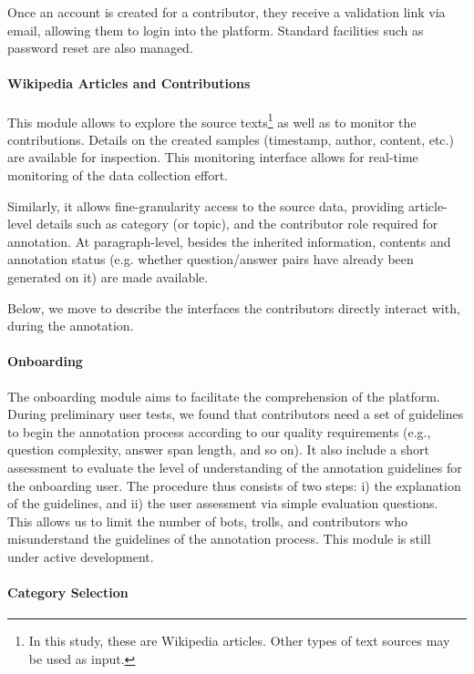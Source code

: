 \documentclass[10pt, a4paper]{article}
\begin{document}
Once an account is created for a contributor, they receive a validation link via email, allowing them to login into the platform.
Standard facilities such as password reset are also managed.

\paragraph{Wikipedia Articles and Contributions}

This module allows to explore the source texts\footnote{In this study, these are Wikipedia articles. Other types of text sources may be used as input.} as well as to monitor the contributions. Details on the created samples (timestamp, author, content, etc.) are available for inspection. This monitoring interface allows for real-time monitoring of the data collection effort.

Similarly, it allows fine-granularity access to the source data, providing article-level details such as category (or topic), and the contributor role required for annotation. At paragraph-level, besides the inherited information, contents and annotation status (e.g. whether question/answer pairs have already been generated on it) are made available.

Below, we move to describe the interfaces the contributors directly interact with, during the annotation.

\paragraph{Onboarding}

The onboarding module aims to facilitate the comprehension of the platform. During preliminary user tests, we found that contributors need a set of guidelines to begin the annotation process according to our quality requirements (e.g., question complexity, answer span length, and so on). It also include a short assessment to evaluate the level of understanding of the annotation guidelines for the onboarding user. The procedure thus consists of two steps: i) the explanation of the guidelines, and ii) the user assessment via simple evaluation questions. This allows us to limit the number of bots, trolls, and  contributors who misunderstand the guidelines of the annotation process. This module is still under active development.

\paragraph{Category Selection}
\end{document}
